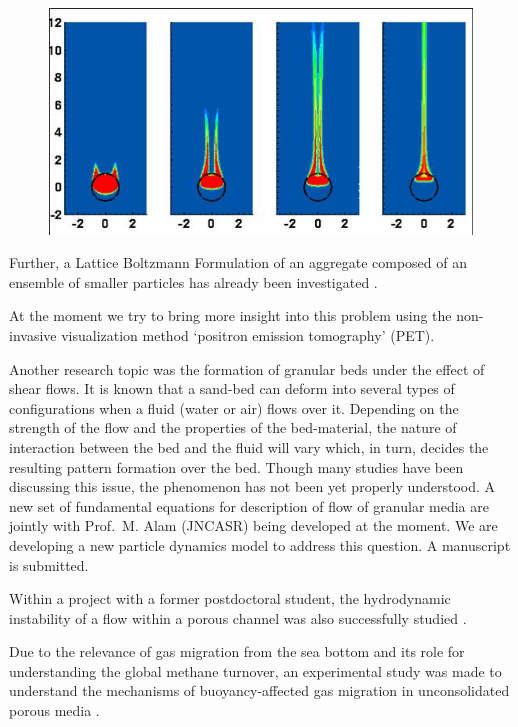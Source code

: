 \begin{figure}[ht]
  \begin{center}
    \includegraphics[width=\hsize]{Khalli/khalili-fig.jpg}
    \label{fig:kahlili-fig}
   \end{center}
\end{figure}

Further, a Lattice Boltzmann Formulation of an aggregate composed
of an ensemble of smaller particles has already been investigated
\cite{BhaKha06}.

At the moment we try to bring more insight into this problem using
the non-invasive visualization method `positron emission tomography'
(PET).


Another research topic was the formation of granular beds under the
effect of shear flows.
It is known that a sand-bed can deform into several types of
configurations when a fluid (water or air) flows over it.
Depending on the strength of the flow and the properties of the
bed-material, the nature of interaction between the bed and the
fluid will vary which, in turn, decides the resulting
pattern formation over the bed.
Though many studies have been discussing this issue,
the phenomenon has not been yet properly understood.
A new set of fundamental equations for description of
flow of granular media are jointly with Prof.~M. Alam (JNCASR)
being developed at the moment.
We are developing a new particle dynamics model to address this
question. A manuscript is submitted.

Within a project with a former postdoctoral student, the
hydrodynamic instability of a flow within a porous channel
was also successfully studied \cite{BerKha06}.

Due to the relevance of gas migration from the sea bottom
and its role for understanding the global methane
turnover, an experimental study was made to understand the
mechanisms of buoyancy-affected gas migration in
unconsolidated porous media \cite{StoKha06}.


